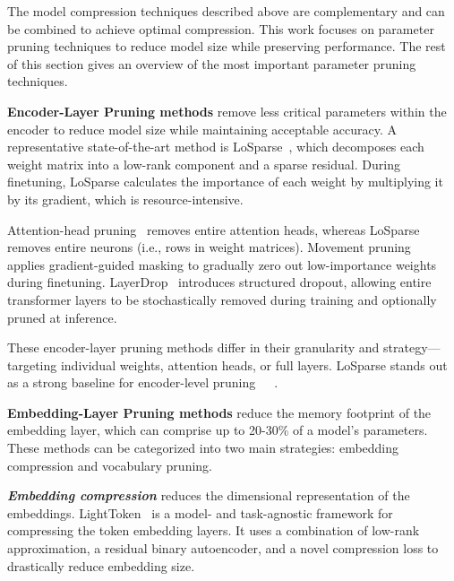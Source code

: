 \documentclass[twocolumn]{article}
\begin{document}
The model compression techniques described above are complementary and can be combined to achieve optimal compression.
This work focuses on parameter pruning techniques to reduce model size while preserving performance. The rest of this section gives an overview of the most important parameter pruning techniques.


\textbf{Encoder-Layer Pruning methods} remove less critical parameters within the encoder to reduce model size while maintaining acceptable accuracy. A representative state-of-the-art method is LoSparse~\cite{li2023losparse}, which decomposes each weight matrix into a low-rank component and a sparse residual. During finetuning, LoSparse calculates the importance of each weight by multiplying it by its gradient, which is resource-intensive.

Attention-head pruning~\cite{michel2019sixteen} removes entire attention heads, whereas LoSparse removes entire neurons (i.e., rows in weight matrices). Movement pruning~\cite{sanh2020movement} applies gradient-guided masking to gradually zero out low-importance weights during finetuning. LayerDrop~\cite{fan2020layerdrop} introduces structured dropout, allowing entire transformer layers to be stochastically removed during training and optionally pruned at inference.

These encoder-layer pruning methods differ in their granularity and strategy—targeting individual weights, attention heads, or full layers. LoSparse stands out as a strong baseline for encoder-level pruning~\cite{pmlr-v235-li24bi}~\cite{huang2023awesome}~\cite{ren2025llmcompression}.


\textbf{Embedding-Layer Pruning methods} reduce the memory footprint of the embedding layer, which can comprise up to 20-30\% of a model's parameters. These methods can be categorized into two main strategies: embedding compression and vocabulary pruning.

\textit{\textbf{Embedding compression}} reduces the dimensional representation of the embeddings. LightToken~\cite{wang2023lighttoken} is a model- and task-agnostic framework for compressing the token embedding layers. It uses a combination of low-rank approximation, a residual binary autoencoder, and a novel compression loss to drastically reduce embedding size. 
\end{document}
